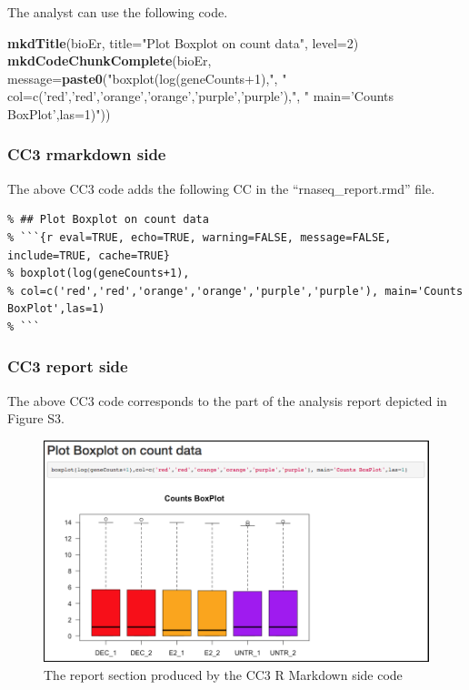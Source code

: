 \documentclass[]{article}
\newenvironment{Shaded}{\begin{snugshade}}{\end{snugshade}}
\newcommand{\DataTypeTok}[1]{\textcolor[rgb]{0.13,0.29,0.53}{#1}}
\newcommand{\DecValTok}[1]{\textcolor[rgb]{0.00,0.00,0.81}{#1}}
\newcommand{\KeywordTok}[1]{\textcolor[rgb]{0.13,0.29,0.53}{\textbf{#1}}}
\newcommand{\NormalTok}[1]{#1}
\newcommand{\StringTok}[1]{\textcolor[rgb]{0.31,0.60,0.02}{#1}}
\begin{document}
The analyst can use the following code.

\begin{Shaded}
\begin{Highlighting}[]
\KeywordTok{mkdTitle}\NormalTok{(bioEr, }\DataTypeTok{title=}\StringTok{"Plot Boxplot on count data"}\NormalTok{, }\DataTypeTok{level=}\DecValTok{2}\NormalTok{)}
\KeywordTok{mkdCodeChunkComplete}\NormalTok{(bioEr, }\DataTypeTok{message=}\KeywordTok{paste0}\NormalTok{(}\StringTok{"boxplot(log(geneCounts+1),"}\NormalTok{,}
                        \StringTok{" col=c('red','red','orange','orange','purple','purple'),"}\NormalTok{, }
                        \StringTok{" main='Counts BoxPlot',las=1)"}\NormalTok{))}
\end{Highlighting}
\end{Shaded}

\hypertarget{cc3-rmarkdown-side}{%
\subsubsection{CC3 rmarkdown side}\label{cc3-rmarkdown-side}}

The above CC3 code adds the following CC in the ``rnaseq\_report.rmd''
file.

\begin{verbatim}
% ## Plot Boxplot on count data
% ```{r eval=TRUE, echo=TRUE, warning=FALSE, message=FALSE, include=TRUE, cache=TRUE}
% boxplot(log(geneCounts+1), 
% col=c('red','red','orange','orange','purple','purple'), main='Counts BoxPlot',las=1)
% ```
\end{verbatim}

\hypertarget{cc3-report-side}{%
\subsubsection{CC3 report side}\label{cc3-report-side}}

The above CC3 code corresponds to the part of the analysis report
depicted in Figure S3.

\begin{figure}[ht]

{\centering \includegraphics[width=0.95\linewidth]{imgs/3} 

}

\caption{The report section produced by the CC3 R Markdown side code}\label{fig:unnamed-chunk-8}
\end{figure}
\end{document}
